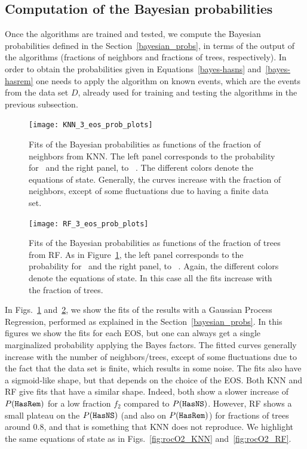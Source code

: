 \subsection{Computation of the Bayesian probabilities}

Once the algorithms are trained and tested, we compute the Bayesian
probabilities defined in the Section~\ref{bayesian_probs}, in terms of the 
output of the algorithms (fractions of neighbors and fractions of trees, 
respectively). In order to obtain the probabilities given in 
Equations~\ref{bayes-hasns} and~\ref{bayes-hasrem} one needs to apply
 the algorithm on known events, which are the events from the data set $D$, already used for training and testing the algorithms in the previous subsection. 

\begin{figure}%
\texttt{[image: KNN\_3\_eos\_prob\_plots]}
\caption{Fits of the Bayesian probabilities as functions of the fraction of neighbors from \ac{KNN}. The left panel corresponds to the probability for \hasns\ and the right panel, to \hasrem\ . The different colors denote the equations of state. Generally, the curves increase with the fraction of neighbors, except of some fluctuations due to having a finite data set.}
\label{fig:bayesian_prob_fits_KNN}
\end{figure}

\begin{figure}%
\texttt{[image: RF\_3\_eos\_prob\_plots]}
\caption{Fits of the Bayesian probabilities as functions of the fraction of trees from \ac{RF}. As in Figure~\ref{fig:bayesian_prob_fits_KNN}, the left panel corresponds to the probability for \hasns\ and the right panel, to \hasrem\ . Again, the different colors denote the equations of state. In this case all the fits increase with the fraction of trees.}
\label{fig:bayesian_prob_fits_RF}
\end{figure}

In Figs.~\ref{fig:bayesian_prob_fits_KNN} and~\ref{fig:bayesian_prob_fits_RF}, 
we show the fits of  the results with a Gaussian Process Regression,
performed as explained in the Section~\ref{bayesian_probs}. In this figures we show
the fits for each EOS, but one can always get a single marginalized probability
applying the Bayes factors. The fitted curves generally increase with the number of neighbors/trees, except of some fluctuations due to the fact that the data set is finite, which results in some noise. The fits also have a
sigmoid-like shape, but that depends on the choice of the EOS. Both \ac{KNN}
and \ac{RF} give fits that have a similar shape. Indeed, both show a slower
increase of $P({{\tt HasRem}})$ for a low fraction $f_2$ compared to $P({{\tt HasNS}})$.
However, \ac{RF} shows a small plateau on the $P({{\tt HasNS}})$ (and also on
$P({{\tt HasRem}})$) for fractions of trees around $0.8$, and that is something that
\ac{KNN} does not reproduce. We highlight the same equations of state as in
Figs.~\ref{fig:rocO2_KNN} and~\ref{fig:rocO2_RF}.

